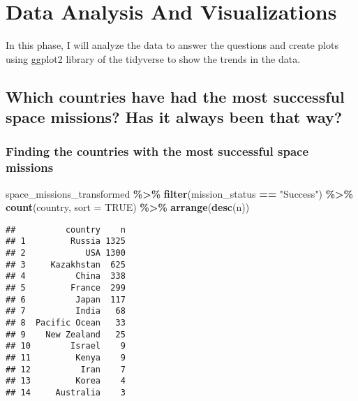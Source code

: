\documentclass[
]{article}
\newenvironment{Shaded}{\begin{snugshade}}{\end{snugshade}}
\newcommand{\AttributeTok}[1]{\textcolor[rgb]{0.13,0.29,0.53}{#1}}
\newcommand{\ConstantTok}[1]{\textcolor[rgb]{0.56,0.35,0.01}{#1}}
\newcommand{\FunctionTok}[1]{\textcolor[rgb]{0.13,0.29,0.53}{\textbf{#1}}}
\newcommand{\NormalTok}[1]{#1}
\newcommand{\SpecialCharTok}[1]{\textcolor[rgb]{0.81,0.36,0.00}{\textbf{#1}}}
\newcommand{\StringTok}[1]{\textcolor[rgb]{0.31,0.60,0.02}{#1}}
\begin{document}
\hypertarget{data-analysis-and-visualizations}{%
\section{Data Analysis And
Visualizations}\label{data-analysis-and-visualizations}}

In this phase, I will analyze the data to answer the questions and
create plots using ggplot2 library of the tidyverse to show the trends
in the data.

\hypertarget{which-countries-have-had-the-most-successful-space-missions-has-it-always-been-that-way}{%
\subsection{\texorpdfstring{\textbf{Which countries have had the most
successful space missions? Has it always been that
way?}}{Which countries have had the most successful space missions? Has it always been that way?}}\label{which-countries-have-had-the-most-successful-space-missions-has-it-always-been-that-way}}

\hypertarget{finding-the-countries-with-the-most-successful-space-missions}{%
\subsubsection{Finding the countries with the most successful space
missions}\label{finding-the-countries-with-the-most-successful-space-missions}}

\begin{Shaded}
\begin{Highlighting}[]
\NormalTok{space\_missions\_transformed }\SpecialCharTok{\%\textgreater{}\%} 
  \FunctionTok{filter}\NormalTok{(mission\_status }\SpecialCharTok{==} \StringTok{"Success"}\NormalTok{) }\SpecialCharTok{\%\textgreater{}\%} 
  \FunctionTok{count}\NormalTok{(country, }\AttributeTok{sort =} \ConstantTok{TRUE}\NormalTok{) }\SpecialCharTok{\%\textgreater{}\%} 
  \FunctionTok{arrange}\NormalTok{(}\FunctionTok{desc}\NormalTok{(n))}
\end{Highlighting}
\end{Shaded}

\begin{verbatim}
##          country    n
## 1         Russia 1325
## 2            USA 1300
## 3     Kazakhstan  625
## 4          China  338
## 5         France  299
## 6          Japan  117
## 7          India   68
## 8  Pacific Ocean   33
## 9    New Zealand   25
## 10        Israel    9
## 11         Kenya    9
## 12          Iran    7
## 13         Korea    4
## 14     Australia    3
\end{verbatim}
\end{document}
